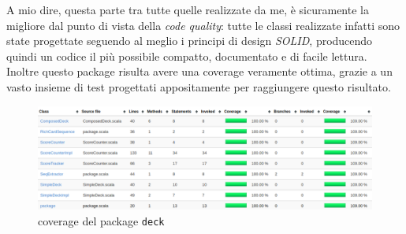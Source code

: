\begin{itemize}
	A mio dire, questa parte tra tutte quelle realizzate da me, è sicuramente la migliore dal punto di vista della \textit{code quality}: tutte le classi realizzate infatti sono state progettate seguendo al meglio i principi di design \textit{SOLID}, producendo quindi un codice il più possibile compatto, documentato e di facile lettura.\\
	Inoltre questo package risulta avere una coverage veramente ottima, grazie a un vasto insieme di test progettati appositamente per raggiungere questo risultato. 
	
	\begin{figure}[H]
		\includegraphics[width=\textwidth,height=\textheight,keepaspectratio]{deckCoverage}
		\caption{coverage del package \texttt{deck}}
	\end{figure}
	

\end{itemize}

